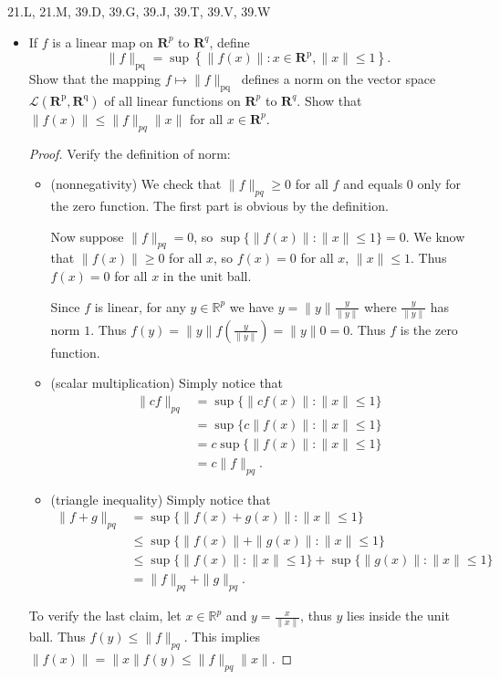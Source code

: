 
21.L, 21.M, 39.D, 39.G, 39.J, 39.T, 39.V, 39.W
\begin{itemize}
	\item [21.L] If $f$ is a linear map on $\mathbf{R}^p$ to $\boldsymbol{R}^q$, define
\[
\|f\|_{\mathrm{pq}}=\sup \left\{\|f(x)\|: x \in \mathbf{R}^{\mathrm{p}},\|x\| \leq 1\right\} .
\]
Show that the mapping $f \mapsto\|f\|_{\text {pq }}$ defines a norm on the vector space $\mathscr{L}\left(\mathbf{R}^{\mathrm{p}}, \mathbf{R}^{\mathrm{q}}\right)$ of all linear functions on $\boldsymbol{R}^p$ to $\boldsymbol{R}^q$. Show that $\|f(x)\| \leq\|f\|_{p q}\|x\|$ for all $x \in \boldsymbol{R}^p$.

\begin{proof}
	Verify the definition of norm:
	\begin{itemize}
		\item (nonnegativity)
			We check that $\|f\|_{pq}\ge 0$ for all $f$ and equals $0$ only for the zero function. The first part is obvious by the definition. 

			Now suppose $\|f\|_{pq }= 0$, so $\operatorname{sup} \{\|f(x)\|: \|x\| \le 1\}  = 0$. We know that $\|f(x)\| \ge 0$ for all $x$, so $f(x) = 0$ for all $x$, $\|x\|\le 1$. Thus $f(x) = 0$ for all $x$ in the unit ball. 

			Since $f$ is linear, for any $y \in \mathbb{R}^p$ we have $y = \|y\| \frac{y}{\|y\|}$ where $\frac{y}{\|y\|}$ has norm $1$. Thus $f(y) = \|y\| f(\frac{y}{\|y\|}) = \|y\|0 = 0$. Thus $f$ is the zero function.
		\item (scalar multiplication)
			Simply notice that
			\begin{align*}
				\|cf \|_{pq } 
				&= \operatorname{sup} \{\|cf(x)\|: \|x \|\le 1\}\\
				&= \operatorname{sup} \{c\|f(x)\|: \|x \|\le 1\}\\
				&= c\operatorname{sup} \{\|f(x)\|: \|x \|\le 1\}\\
			&= c\|f \|_{pq } 
				.
			\end{align*}
		\item (triangle inequality)
			Simply notice that
			\begin{align*}
				\|f + g\|_{pq}
				&= \operatorname{sup} \{\|f(x) + g(x)\|: \|x \|\le 1\}\\
				&\le  \operatorname{sup} \{\|f(x) \|+\| g(x)\|: \|x \|\le 1\}\\
				&\le   \operatorname{sup} \{\|f(x) \|: \|x \|\le 1\}+  \operatorname{sup} \{\|g(x) \|: \|x \|\le 1\}\\
				&=
				\|f \|_{pq}
				+\| g\|_{pq}
			.\end{align*} 
	\end{itemize}
	To verify the last claim, let $x \in \mathbb{R}^p$ and $y = \frac{x}{\|x\|}$, thus $y$ lies inside the unit ball. Thus $f(y)\le \|f\|_{pq }$. This implies $\|f(x) \|= \|x\|f(y) \le \|f\|_{pq }\|x\|$.
\end{proof}


\end{itemize}
